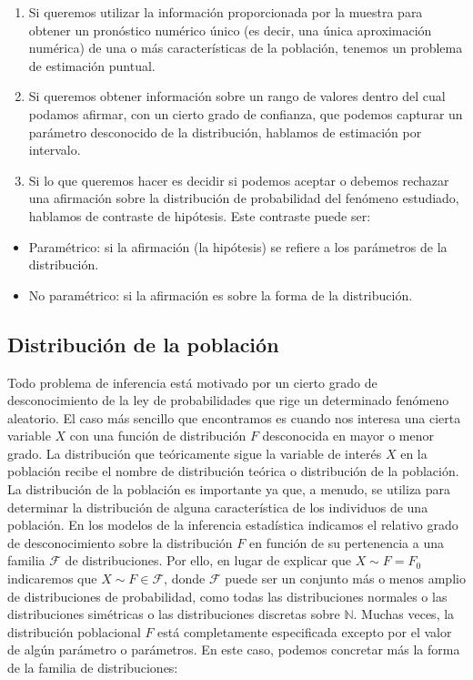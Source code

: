 \documentclass[
]{article}
\providecommand{\tightlist}{%
  \setlength{\itemsep}{0pt}\setlength{\parskip}{0pt}}
\begin{document}
\begin{enumerate}
\def\labelenumi{\arabic{enumi}.}
\tightlist
\item
  Si queremos utilizar la información proporcionada por la muestra para obtener un pronóstico numérico único (es decir, una única aproximación numérica) de una o más características de la población, tenemos un problema de estimación puntual.
\item
  Si queremos obtener información sobre un rango de valores dentro del cual podamos afirmar, con un cierto grado de confianza, que podemos capturar un parámetro desconocido de la distribución, hablamos de estimación por intervalo.
\item
  Si lo que queremos hacer es decidir si podemos aceptar o debemos rechazar una afirmación sobre la distribución de probabilidad del fenómeno estudiado, hablamos de contraste de hipótesis. Este contraste puede ser:
\end{enumerate}

\begin{itemize}
\tightlist
\item
  Paramétrico: si la afirmación (la hipótesis) se refiere a los parámetros de la distribución.
\item
  No paramétrico: si la afirmación es sobre la forma de la distribución.
\end{itemize}

\subsection{Distribución de la población}\label{distribuciuxf3n-de-la-poblaciuxf3n}

Todo problema de inferencia está motivado por un cierto grado de desconocimiento de la ley de probabilidades que rige un determinado fenómeno aleatorio.
El caso más sencillo que encontramos es cuando nos interesa una cierta variable \(X\) con una función de distribución \(F\) desconocida en mayor o menor grado.
La distribución que teóricamente sigue la variable de interés \(X\) en la población recibe el nombre de distribución teórica o distribución de la población. La distribución de la población es importante ya que, a menudo, se utiliza para determinar la distribución de alguna característica de los individuos de una población.
En los modelos de la inferencia estadística indicamos el relativo grado de desconocimiento sobre la distribución \(F\) en función de su pertenencia a una familia \(\mathcal{F}\) de distribuciones. Por ello, en lugar de explicar que \(X \sim F=F_{0}\) indicaremos que \(X \sim F \in \mathcal{F}\), donde \(\mathcal{F}\) puede ser un conjunto más o menos amplio de distribuciones de probabilidad, como todas las distribuciones normales o las distribuciones simétricas o las distribuciones discretas sobre \(\mathbb{N}\).
Muchas veces, la distribución poblacional \(F\) está completamente especificada excepto por el valor de algún parámetro o parámetros. En este caso, podemos concretar más la forma de la familia de distribuciones:
\end{document}
